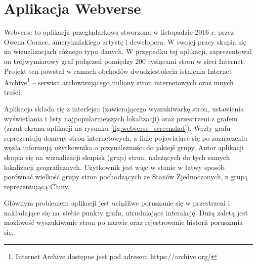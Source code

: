 \section{Aplikacja Webverse}

Webverse \cite{Webverse} to aplikacja przeglądarkowa stworzona w listopadzie 2016 r. przez Owena Cornec, amerykańskiego artystę i dewelopera. W swojej pracy skupia się na wizualizacjach różnego typu danych. W przypadku tej aplikacji, zaprezentował on trójwymiarowy graf połączeń pomiędzy 200 tysiącami stron w sieci Internet. Projekt ten powstał w ramach obchodów dwudziestolecia istnienia Internet Archive\footnote{Internet Archive dostępne jest pod adresem https://archive.org/} – serwisu archiwizującego miliony stron internetowych oraz innych treści.

Aplikacja składa się z interfejsu (zawierającego wyszukiwarkę stron, ustawienia wyświetlania i listy najpopularniejszych lokalizacji) oraz przestrzeni z grafem (zrzut ekranu aplikacji na rysunku \ref{fig:webverse_screenshot}). Węzły grafu reprezentują domeny stron internetowych, a linie pojawiające się po zaznaczeniu węzła informują użytkownika o przynależności do jakiejś grupy. Autor aplikacji skupia się na wizualizacji skupisk (grup) stron, należących do tych samych lokalizacji geograficznych. Użytkownik jest więc w stanie w łatwy sposób porównać wielkość grupy stron pochodzących ze Stanów Zjednoczonych, z grupą reprezentującą Chiny.

Głównym problemem aplikacji jest uciążliwe poruszanie się w przestrzeni i nakładające się na~siebie punkty grafu, utrudniające interakcję. Dużą zaletą jest możliwość wyszukiwanie stron po nazwie oraz rejestrowanie historii poruszania się.

